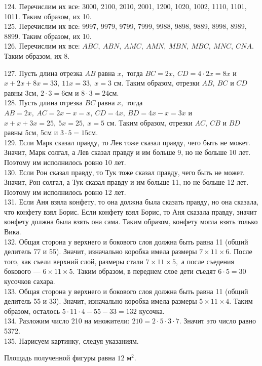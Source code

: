 124. Перечислим их все: 3000, 2100, 2010, 2001, 1200, 1020, 1002, 1110, 1101, 1011. Таким образом, их 10.\\
125. Перечислим их все: 9997, 9979, 9799, 7999, 9988, 9898, 9889, 8998, 8989, 8899. Таким образом, их 10.\\
126. Перечислим их все: $ABC,\ ABN,\ AMC,\ AMN,\ MBN,\ MBC,\ MNC,\ CNA.$ Таким образом, их 8.
\begin{center}
\begin{figure}[ht!]
\end{figure}
\end{center}
127.  Пусть длина отрезка $AB$ равна $x,$ тогда $BC=2x,\ CD=4\cdot2x=8x$ и $x+2x+8x=33,\ 11x=33,\ x=3$ см. Таким образом, отрезки $AB,\ BC$ и $CD$ равны 3см, $2\cdot3=6$см и $8\cdot3=24$см.\\
128. Пусть длина отрезка $BC$ равна $x,$ тогда $AB=2x,\ AC=2x-x=x,\ CD=4x,\ BD=4x-x=3x$ и $x+x+3x=25,\ 5x=25,\ x=5$ см. Таким образом, отрезки $AC,\ CB$ и $BD$ равны 5см, 5см и $3\cdot5=15$см.\\
129. Если Марк сказал правду, то Лев тоже сказал правду, чего быть не может. Значит, Марк солгал, а Лев сказал правду и им больше 9, но не больше 10 лет. Поэтому им исполнилось ровно 10 лет.\\
130. Если Рон сказал правду, то Тук тоже сказал правду, чего быть не может. Значит, Рон солгал, а Тук сказал правду и им больше 11, но не больше 12 лет. Поэтому им исполнилось ровно 12 лет.\\
131. Если Аня взяла конфету, то она должна была сказать правду, но она сказала, что конфету взял Борис. Если конфету взял Борис, то Аня сказала правду, значит конфету должна была взять она сама. Таким образом, конфету могла взять только Вика.\\
132. Общая сторона у верхнего и бокового слоя должна быть равна 11 (общий делитель 77 и 55). Значит, изначально коробка имела размеры $7\times11\times6.$ После того, как съели верхний слой, размеры стали $7\times11\times5,$ а после съедения бокового --- $6\times11\times5.$ Таким образом, в переднем слое дети съедят $6\cdot5=30$ кусочков сахара.\\
133. Общая сторона у верхнего и бокового слоя должна быть равна 11 (общий делитель 55 и 33). Значит, изначально коробка имела размеры $5\times11\times4.$ Таким образом, осталось $5\cdot11\cdot4-55-33=132$ кусочка.\\
134. Разложим число 210 на множители: $210=2\cdot5\cdot3\cdot7.$ Значит это число равно 5372.\\
135. Нарисуем картинку, следуя указаниям.
\begin{center}
\begin{figure}[ht!]
\end{figure}
\end{center}
Площадь полученной фигуры равна $12\text{ м}^2.$

